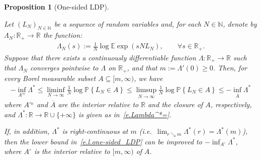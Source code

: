 \documentclass[11pt]{amsart}
\newtheorem{proposition}{Proposition}
\theoremstyle{remark}
\theoremstyle{definition}
\numberwithin{equation}{section}
\numberwithin{proposition}{section}
\numberwithin{figure}{section}
\numberwithin{table}{section}
\newcommand{\N}{\mathbb{N}}
\newcommand{\R}{\mathbb{R}}
\newcommand{\E}{\mathbb{E}}
\renewcommand{\P}{\mathbb{P}}
\renewcommand{\leq}{\leqslant}
\renewcommand{\geq}{\geqslant}
\renewcommand{\subset}{\subseteq}
\renewcommand{\bar}{\overline}
\newcommand{\Ll}{\left}
\newcommand{\Rr}{\right}
\newcommand{\1}{\mathbf{1}}
\begin{document}
\begin{proposition}[One-sided LDP]\label{p.one-sided_LDP}

Let $(L_N)_{N\in\N}$ be a sequence of random variables and, for each $N\in\N$, denote by $\Lambda_N:\R_+\to\R$ the function:
\begin{align}\label{e.Lambda_N=}
    \Lambda_N(s) := \frac{1}{N}\log \E \exp\Ll(s N L_N\Rr),\qquad\forall s\in \R_+.
\end{align}
Suppose that there exists a continuously differentiable function $\Lambda:\R_+\to\R$ such that $\Lambda_N$ converges pointwise to $\Lambda$ on $\R_+$, and that $m := \Lambda'(0) \geq 0$. Then, for every Borel measurable subset $A\subset [m,\infty)$, we have
\begin{align}
\label{e.l.one-sided_LDP}
    -\inf_{A^{\circ_\R}}\Lambda^*\leq \liminf_{N\to\infty}\frac{1}{N}\log \P\Ll\{L_N\in A\Rr\}\leq \limsup_{N\to\infty}\frac{1}{N}\log \P\Ll\{L_N\in A\Rr\} \leq  -\inf_{\bar A}\Lambda^*
\end{align}
where $A^{\circ_\R}$ and $\bar A$ are the interior relative to $\R$ and the closure of $A$, respectively, and $\Lambda^*:\R\to\R\cup\{+\infty\}$ is given as in~\eqref{e.Lambda^*=}.

If, in addition, $\Lambda^*$ is right-continuous at $m$ (i.e.\ $\lim_{r\searrow m}\Lambda^*(r)=\Lambda^*(m)$), then the lower bound in~\eqref{e.l.one-sided_LDP} can be improved to $-\inf_{A^\circ}\Lambda^*$, where $A^\circ$ is the interior relative to $[m,\infty)$ of $A$.
\end{proposition}
\end{document}
